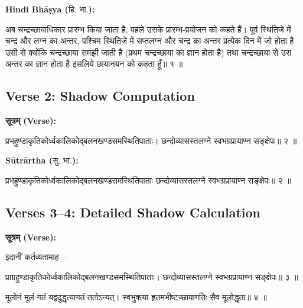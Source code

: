 \documentclass[11pt,a4paper]{article}
\newcommand{\dev}[1]{{\devanagarifont #1}}
\newcommand{\arth}{\textbf{Sūtrārtha (}\dev{सु. भा.}\textbf{):}\ }
\newcommand{\hindi}{\textbf{Hindi Bhāṣya (}\dev{हि. भा.}\textbf{):}\ }
\newenvironment{sanskritverse}{%
  \begin{center}\begin{minipage}{0.9\textwidth}
  \setlength{\leftskip}{1em}
  \setlength{\rightskip}{1em}
  \dev
}{\end{minipage}\end{center}}
\begin{document}
\noindent\hindi
\begin{sanskritverse}
अब चन्द्रच्छायाधिकार प्रारम्भ किया जाता है, पहले उसके प्रारम्भ-प्रयोजन को कहते हैं।
पूर्व स्थितिजे में चन्द्र और लग्न का अन्तर, पश्चिम स्थितिजे में सप्तलग्न और चन्द्र का अन्तर
प्रत्येक दिन में जो होता है उसी से क्योंकि चन्द्रच्छाया समझी जाती है (प्रथम चन्द्रच्छाया
का ज्ञान होता है) तथा चन्द्रच्छाया से उस अन्तर का ज्ञान होता है इसलिये छायानयन को
कहता हूँ॥ १ ॥
\end{sanskritverse}

\subsection{Verse 2: Shadow Computation}

\vspace{0.5em}
\noindent\textbf{\dev{सूत्रम् (Verse):}}
\begin{sanskritverse}
प्रभहुण्डाकृतिकोर्ध्वकालिकोद्बलनखण्डसमस्थितिपाताः।
छन्दोव्यासस्तलग्ने स्वभग्रप्रायाण्न सङ्क्षेपः॥ २ ॥
\end{sanskritverse}

\noindent\arth
\begin{sanskritverse}
प्रभहुण्डाकृतिकोर्ध्वकालिकोद्बलनखण्डसमस्थितिपाताः छन्दोव्यासस्तलग्ने
स्वभग्रप्रायाण्न सङ्क्षेपः॥ २ ॥
\end{sanskritverse}

\subsection{Verses 3--4: Detailed Shadow Calculation}

\vspace{0.5em}
\noindent\textbf{\dev{सूत्रम् (Verse):}}
\begin{sanskritverse}
इदानीं कर्तव्यतामाह—
\end{sanskritverse}

\begin{sanskritverse}
प्राग्रहुण्डाकृतिकोर्ध्वकालिकोद्बलनखण्डसमस्थितिपाताः।
छन्दोव्यासस्तलग्ने स्वभग्रप्रायाण्न सङ्क्षेपः॥ ३ ॥
\end{sanskritverse}

\begin{sanskritverse}
मूलोनं मूलं गतं यद्वदुद्धृत्यागतं ततोऽन्यत्।
स्वभुक्त्या हृतमभीष्टच्छायागतिः सैव मूलोद्धृता॥ ४ ॥
\end{sanskritverse}

\newpage
\end{document}
